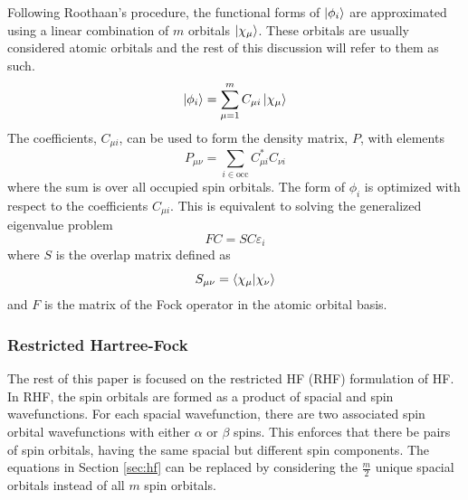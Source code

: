 \documentclass[final,3p,times,twocolumn]{elsarticle}
\begin{document}
Following Roothaan's procedure,\cite{roothaan} the functional forms of $\ket{\phi_i}$ are approximated using a linear combination of $m$ orbitals $\ket{\chi_\mu}$. These orbitals are usually considered atomic orbitals and the rest of this discussion will refer to them as such.
\begin{equation} \label{eq:lcao}
\ket{\phi_i} = \sum_{\mu=1}^m C_{\mu i} \ket{\chi_\mu}
\end{equation}
The coefficients, $C_{\mu i}$, can be used to form the density matrix, $P$, with elements
\begin{equation} \label{eq:density}
P_{\mu \nu} = \sum_{i\in\text{occ}} C_{\mu i}^*C_{\nu i}
\end{equation}
where the sum is over all occupied spin orbitals. The form of $\phi_i$ is optimized with respect to the coefficients $C_{\mu i}$. This is equivalent to solving the generalized eigenvalue problem 
\begin{equation}\label{eq:fock}
FC = SC\varepsilon_i
\end{equation}
where $S$ is the overlap matrix defined as
\begin{equation}
S_{\mu \nu} = \bra{\chi_\mu}\ket{\chi_\nu}
\end{equation}
and $F$ is the matrix of the Fock operator in the atomic orbital basis. %

\subsubsection{Restricted Hartree-Fock} \label{sec:rhf}
The rest of this paper is focused on the restricted HF (RHF) formulation of HF. In RHF, the spin orbitals are formed as a product of spacial and spin wavefunctions. For each spacial wavefunction, there are two associated spin orbital wavefunctions with either $\alpha$ or $\beta$ spins. This enforces that there be pairs of spin orbitals, having the same spacial but different spin components. The equations in Section \ref{sec:hf} can be replaced by considering the $\frac{m}{2}$ unique spacial orbitals instead of all $m$ spin orbitals.
\end{document}
